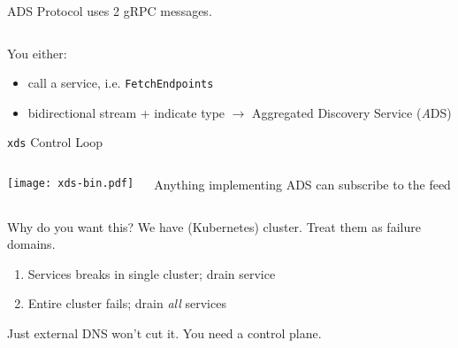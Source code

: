 \documentclass[aspectratio=169]{beamer}
\begin{document}
    \begin{frame}{ADS}
        Protocol uses 2 gRPC messages.
        \begin{columns}[T]
            \begin{column}{0.5\textwidth}
                
            \end{column}
            \begin{column}{0.5\textwidth}
                
            \end{column}
        \end{columns}

        You either:

        \begin{itemize}
            \item call a service, i.e. \texttt{FetchEndpoints}
            \item bidirectional stream + indicate type $\rightarrow$ Aggregated Discovery Service (\emph{A}DS)
        \end{itemize}

    \end{frame}

    \begin{frame}[plain]{\texttt{xds} Control Loop}
        \begin{columns}
            \begin{column}{0.5\textwidth}
                \texttt{[image: xds-bin.pdf]}
            \end{column}
            \begin{column}{0.5\textwidth}
                Anything implementing ADS can subscribe to the feed
            \end{column}
        \end{columns}
    \end{frame}

    \begin{frame}{Why do you want this?}
        We have (Kubernetes) cluster. Treat them as failure domains.
        \begin{enumerate}
            \item Services breaks in single cluster; drain service
            \item Entire cluster fails; drain \emph{all} services
        \end{enumerate}
        Just external DNS won't cut it. You need a control plane.
    \end{frame}
\end{document}
